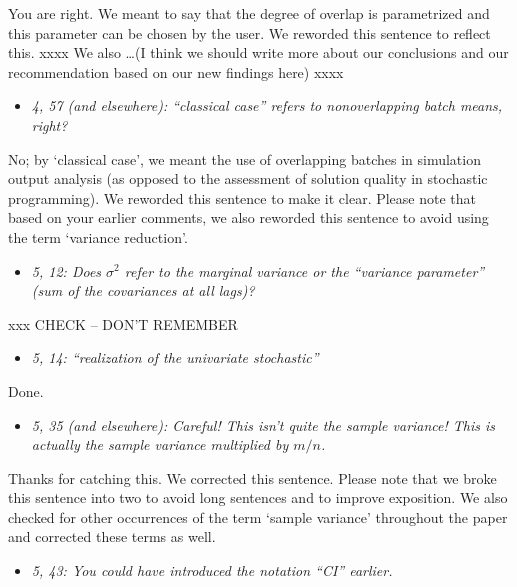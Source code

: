 \documentclass[11pt,notitlepage,onecolumn]{article}
\newcommand{\noi}{\noindent}
\begin{document}
\noi
You are right.
We meant to say that the degree of overlap is parametrized and this parameter can be chosen by the user. 
We reworded this sentence to reflect this. 
xxxx  We also \ldots (I think we should write more about our conclusions and our recommendation based on our new findings here) xxxx
\medskip 



\begin{itemize}
\item[] \textit{4, 57 (and elsewhere): ``classical case'' refers to nonoverlapping batch means, right?}
\end{itemize}

\noi
No; by `classical case', we meant the use of overlapping batches in simulation output analysis (as opposed to the assessment of solution quality in stochastic programming). 
We reworded this sentence to make it clear. 
Please note that based on your earlier comments, we also reworded this sentence to avoid using the term `variance reduction'. 
\medskip 



\begin{itemize}
\item[] \textit{5, 12: Does $\sigma^2$ refer to the marginal variance or the ``variance parameter'' (sum of the covariances at all lags)?}
\end{itemize}

\noi
xxx   CHECK -- DON'T REMEMBER
\medskip 



\begin{itemize}
\item[] \textit{5, 14: ``realization of the univariate stochastic''}
\end{itemize}

\noi
Done.  
\medskip 


\begin{itemize}
\item[] \textit{5, 35 (and elsewhere): Careful! This isn't quite the sample variance! This is actually the sample variance multiplied by $m/n$.}
\end{itemize}

\noi
Thanks for catching this. 
We corrected this sentence. 
Please note that we broke this sentence into two to avoid long sentences and to improve exposition. 
We also checked for other occurrences of the term `sample variance' throughout the paper and corrected these terms as well. 
\medskip 


\begin{itemize}
\item[] \textit{5, 43: You could have introduced the notation ``CI'' earlier.}
\end{itemize}
\end{document}
